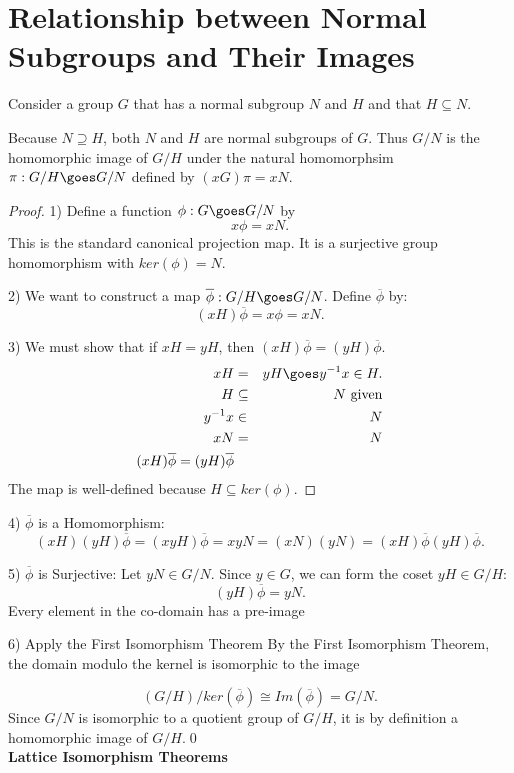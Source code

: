 \section{  Relationship between Normal Subgroups and Their Images}
Consider a group $G$ that has a normal subgroup $N$ and $H$ and that $H \subseteq N$. 
\begin{theorem}
Because $N\supseteq H$, both $N$ and $H$ are normal subgroups of $G$. Thus $G/N$ is the homomorphic image of $G/H$ under the natural homomorphsim
$\pi: G/H \goes G/N$ defined by 
$(xG)\pi = xN$. 
\end{theorem}
\begin{proof}

1) Define a function $\phi: G\goes G/N$ by
\[ x\phi = xN.\]
This is the standard canonical projection map. It is a surjective group homomorphism with $ker(\phi) = N$. 

2) We want to construct a map $\overline{\phi}: G/H \goes G/N$.
Define $\overline{\phi}$ by:
\[ (xH) \overline{\phi} = x\phi = xN.\]

3) We must show that if $xH = yH$, then $(xH)\overline{\phi} = (yH)\overline{\phi}.$
\begin{eqnarray*}
xH &=& yH \goes y^{-1}x \in H.\cr
H &\subseteq& N \mbox{  given}\cr
y^{-1}x &\in& N\cr
xN &=& N\cr
(xH)\overline{\phi} = (yH)\overline{\phi}\cr
\end{eqnarray*}
The map is well-defined because $ H \subseteq ker(\phi)$. 
\end{proof}

4) $\overline{\phi}$ is a Homomorphism:
\[ (xH) (yH) \overline{\phi} = (xyH)\overline{\phi} = xyN = (xN)(yN) = (xH)\overline{\phi} (yH)\overline{\phi}.\]

5) $\overline{\phi}$ is Surjective:
Let $yN \in G/N$. 
Since $y\in G$, we can form the coset $yH \in G/H$:
\[ (yH)\overline{\phi} = yN.\] Every element in the co-domain has a pre-image
 
6) Apply the First Isomorphism Theorem
By the First Isomorphism Theorem, the domain modulo the kernel is isomorphic to the image

\[ (G/H)/ker(\overline{\phi}) \cong Im(\overline{\phi}) = G/N .\]
Since $G/N$ is isomorphic to a quotient group of $G/H$, it is by definition a homomorphic image of $G/H$.\qed \\

{\bf Lattice Isomorphism Theorems}
 
